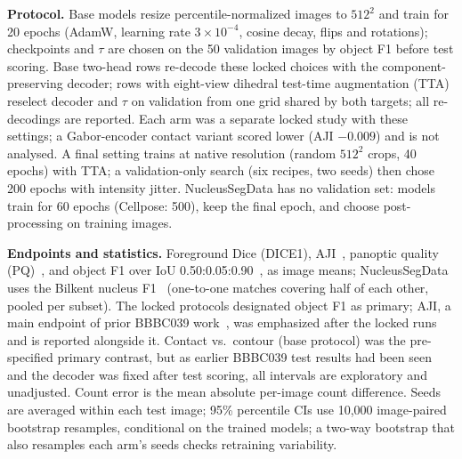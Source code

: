 \documentclass{article}
\begin{document}
\textbf{Protocol.} Base models resize percentile-normalized images to $512^2$ and train for 20 epochs (AdamW, learning rate $3\times10^{-4}$, cosine decay, flips and rotations); checkpoints and $\tau$ are chosen on the 50 validation images by object F1 before test scoring. Base two-head rows re-decode these locked choices with the component-preserving decoder; rows with eight-view dihedral test-time augmentation (TTA) reselect decoder and $\tau$ on validation from one grid shared by both targets; all re-decodings are reported. Each arm was a separate locked study with these settings; a Gabor-encoder contact variant scored lower (AJI $-0.009$) and is not analysed. A final setting trains at native resolution (random $512^2$ crops, 40 epochs) with TTA; a validation-only search (six recipes, two seeds) then chose 200 epochs with intensity jitter. NucleusSegData has no validation set: models train for 60 epochs (Cellpose: 500), keep the final epoch, and choose post-processing on training images.

\textbf{Endpoints and statistics.} Foreground Dice (DICE1), AJI~\cite{kumar2017aji}, panoptic quality (PQ)~\cite{kirillov2019panoptic}, and object F1 over IoU 0.50:0.05:0.90~\cite{caicedo2019evaluation}, as image means; NucleusSegData uses the Bilkent nucleus F1~\cite{koyuncu2018object} (one-to-one matches covering half of each other, pooled per subset). The locked protocols designated object F1 as primary; AJI, a main endpoint of prior BBBC039 work~\cite{wang2022aswnet,yi2022segmentgraph}, was emphasized after the locked runs and is reported alongside it. Contact vs.\ contour (base protocol) was the pre-specified primary contrast, but as earlier BBBC039 test results had been seen and the decoder was fixed after test scoring, all intervals are exploratory and unadjusted. Count error is the mean absolute per-image count difference. Seeds are averaged within each test image; 95\% percentile CIs use 10,000 image-paired bootstrap resamples, conditional on the trained models; a two-way bootstrap that also resamples each arm's seeds checks retraining variability.
\end{document}
